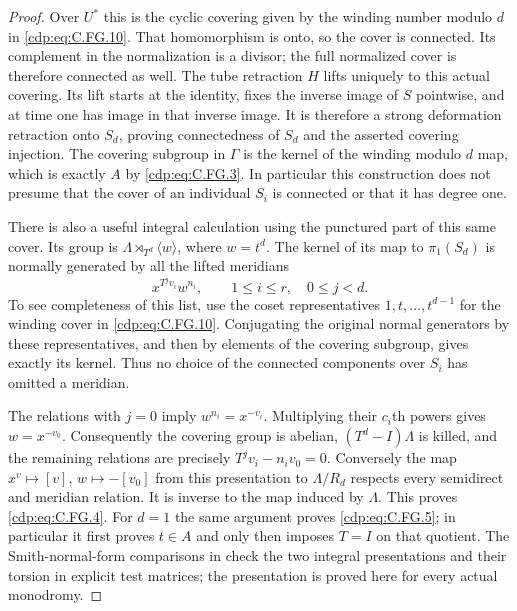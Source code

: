 \begin{proof}
Over $U^*$ this is the cyclic covering given by the winding number
modulo $d$ in \eqref{cdp:eq:C.FG.10}. That homomorphism is onto, so the cover
is connected. Its complement in the normalization is a divisor;
the full normalized cover is therefore connected as well.
The tube retraction $H$ lifts uniquely to this actual covering.
Its lift starts at the identity, fixes the inverse image of $S$
pointwise, and at time one has image in that inverse image. It is
therefore a strong deformation retraction onto $S_d$, proving
connectedness of $S_d$ and the asserted covering injection.
The covering subgroup in $\Gamma$ is the kernel of the winding
modulo $d$ map, which is exactly $A$ by \eqref{cdp:eq:C.FG.3}. In particular
this construction does not presume that the cover of an individual
$S_i$ is connected or that it has degree one.

There is also a useful integral calculation using the punctured
part of this same cover. Its group is
$\Lambda\rtimes_{T^d}\langle w\rangle$, where $w=t^d$.
The kernel of its map to $\pi_1(S_d)$ is normally generated by
all the lifted meridians
\[
                x^{T^jv_i}w^{n_i},
                  \qquad 1\le i\le r,\quad0\le j<d .  \tag{C.FG.13}\label{cdp:eq:C.FG.13}
\]
To see completeness of this list, use the coset representatives
$1,t,\ldots,t^{d-1}$ for the winding cover in \eqref{cdp:eq:C.FG.10}.
Conjugating the original normal generators by these representatives,
and then by elements of the covering subgroup, gives exactly its
kernel. Thus no choice of the connected components over $S_i$
has omitted a meridian.

The relations with $j=0$ imply $w^{n_i}=x^{-v_i}$.
Multiplying their $c_i$th powers gives $w=x^{-v_0}$. Consequently
the covering group is abelian, $(T^d-I)\Lambda$ is killed, and
the remaining relations are precisely
$T^jv_i-n_iv_0=0$. Conversely the map $x^v\mapsto[v]$,
$w\mapsto-[v_0]$ from this presentation to $\Lambda/R_d$
respects every semidirect and meridian relation. It is inverse to
the map induced by $\Lambda$. This proves \eqref{cdp:eq:C.FG.4}. For $d=1$
the same argument proves \eqref{cdp:eq:C.FG.5}; in particular it first proves
$t\in A$ and only then imposes $T=I$ on that quotient.
The Smith-normal-form comparisons in
 check the two integral
presentations and their torsion in explicit test matrices; the
presentation is proved here for every actual monodromy.


\end{proof}
